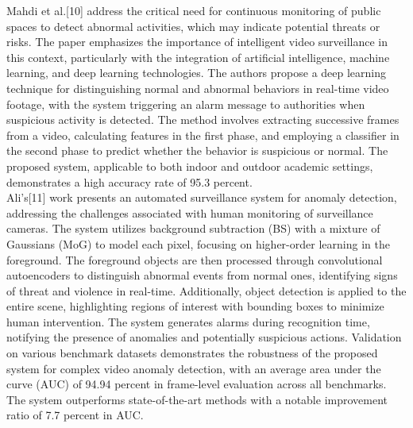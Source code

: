 \documentclass[conference]{IEEEtran}
\begin{document}
Mahdi et al.[10] address the critical need for continuous monitoring of public spaces to detect abnormal activities, which may indicate potential threats or risks. The paper emphasizes the importance of intelligent video surveillance in this context, particularly with the integration of artificial intelligence, machine learning, and deep learning technologies. The authors propose a deep learning technique for distinguishing normal and abnormal behaviors in real-time video footage, with the system triggering an alarm message to authorities when suspicious activity is detected. The method involves extracting successive frames from a video, calculating features in the first phase, and employing a classifier in the second phase to predict whether the behavior is suspicious or normal. The proposed system, applicable to both indoor and outdoor academic settings, demonstrates a high accuracy rate of 95.3 percent.\\

Ali's[11] work presents an automated surveillance system for anomaly detection, addressing the challenges associated with human monitoring of surveillance cameras. The system utilizes background subtraction (BS) with a mixture of Gaussians (MoG) to model each pixel, focusing on higher-order learning in the foreground. The foreground objects are then processed through convolutional autoencoders to distinguish abnormal events from normal ones, identifying signs of threat and violence in real-time. Additionally, object detection is applied to the entire scene, highlighting regions of interest with bounding boxes to minimize human intervention. The system generates alarms during recognition time, notifying the presence of anomalies and potentially suspicious actions. Validation on various benchmark datasets demonstrates the robustness of the proposed system for complex video anomaly detection, with an average area under the curve (AUC) of 94.94 percent in frame-level evaluation across all benchmarks. The system outperforms state-of-the-art methods with a notable improvement ratio of 7.7 percent in AUC.\\
\end{document}
